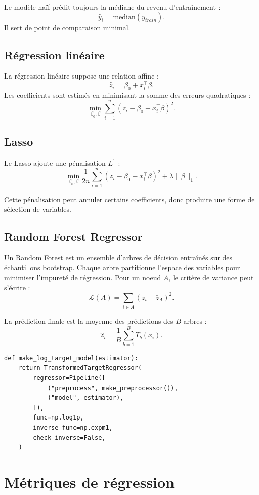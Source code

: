 \documentclass[11pt,a4paper]{article}
\begin{document}
Le modèle naïf prédit toujours la médiane du revenu d'entraînement :
\[
\hat{y}_i = \text{median}(y_{train}).
\]
Il sert de point de comparaison minimal.

\subsection{Régression linéaire}

La régression linéaire suppose une relation affine :
\[
\hat{z}_i = \beta_0 + x_i^\top \beta.
\]
Les coefficients sont estimés en minimisant la somme des erreurs quadratiques :
\[
\min_{\beta_0,\beta}
\sum_{i=1}^{n}
\left(z_i - \beta_0 - x_i^\top\beta\right)^2.
\]

\subsection{Lasso}

Le Lasso ajoute une pénalisation $L^1$ :
\[
\min_{\beta_0,\beta}
\frac{1}{2n}
\sum_{i=1}^{n}
\left(z_i - \beta_0 - x_i^\top\beta\right)^2
+ \lambda \|\beta\|_1.
\]

Cette pénalisation peut annuler certains coefficients, donc produire une forme de sélection de variables.

\subsection{Random Forest Regressor}

Un Random Forest est un ensemble d'arbres de décision entraînés sur des échantillons bootstrap. Chaque arbre partitionne l'espace des variables pour minimiser l'impureté de régression. Pour un noeud $A$, le critère de variance peut s'écrire :
\[
\mathcal{L}(A) =
\sum_{i \in A}
(z_i - \bar{z}_A)^2.
\]

La prédiction finale est la moyenne des prédictions des $B$ arbres :
\[
\hat{z}_i =
\frac{1}{B}
\sum_{b=1}^{B}
T_b(x_i).
\]

\begin{lstlisting}[caption={Modèle de régression avec transformation logarithmique de la cible.}]
def make_log_target_model(estimator):
    return TransformedTargetRegressor(
        regressor=Pipeline([
            ("preprocess", make_preprocessor()),
            ("model", estimator),
        ]),
        func=np.log1p,
        inverse_func=np.expm1,
        check_inverse=False,
    )
\end{lstlisting}

\section{Métriques de régression}
\end{document}
